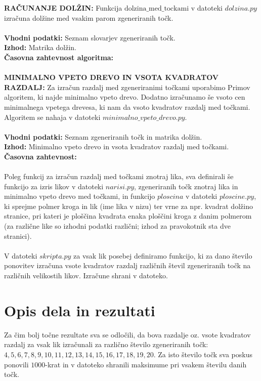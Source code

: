\documentclass[a4paper]{report}
\begin{document}
\textbf{RAČUNANJE DOLŽIN: } Funkcija $\text{dolzina\_med\_tockami}$ v datoteki \colorbox{gray!10}{$dolzina.py$} izračuna dolžine med vsakim parom zgeneriranih točk. \\ \\
\textbf{Vhodni podatki: } Seznam slovarjev zgeneriranih točk. \\
\textbf{Izhod:} Matrika dolžin. \\
\textbf{Časovna zahtevnost algoritma:} \\ \\
\textbf{MINIMALNO VPETO DREVO IN VSOTA KVADRATOV RAZDALJ: } Za izračun razdalj med zgeneriranimi točkami uporabimo Primov algoritem, ki najde minimalno vpeto drevo. Dodatno izračunamo še vsoto cen minimalnega vpetega drevesa, ki nam da vsoto kvadratov razdalj med točkami. Algoritem se nahaja v datoteki \colorbox{gray!10}{$minimalno\_vpeto\_drevo.py$}. \\ \\
\textbf{Vhodni podatki:} Seznam zgeneriranih točk in matrika dolžin. \\ 
\textbf{Izhod: } Minimalno vpeto drevo in vsota kvadratov razdalj med točkami. \\
\textbf{Časovna zahtevnost: } \\ \\
Poleg funkcij za izračun razdalj med točkami znotraj lika, sva definirali še funkcijo za izris likov v datoteki \colorbox{gray!10}{$narisi.py$}, zgeneriranih točk znotraj lika in minimalno vpeto drevo med točkami, in funkcijo $ploscina$ v datoteki \colorbox{gray!10}{$ploscine.py$}, ki sprejme polmer kroga in lik (ime lika v nizu) ter vrne za npr. kvadrat dolžino stranice, pri kateri je ploščina kvadrata enaka ploščini kroga z danim polmerom (za različne like so izhodni podatki različni; izhod za pravokotnik sta dve stranici). \\ \\
V datoteki \colorbox{gray!10}{$skripta.py$} za vsak lik posebej definiramo funkcijo, ki za dano število ponovitev izračuna vsote kvadratov razdalj različnih števil zgeneriranih točk na različnih velikostih likov. Izračune shrani v datoteko.



\section{Opis dela in rezultati}

Za čim bolj točne rezultate sva se odločili, da bova razdalje oz. vsote kvadratov razdalj za vsak lik izračunali za različno število zgeneriranih točk: $4, 5, 6, 7, 8, 9, 10, 11, 12, 13, 14, 15, 16, 17, 18, 19, 20$. Za isto število točk sva poskus ponovili $1000$-krat in v datoteko shranili maksimume pri vsakem številu danih točk.
\end{document}
